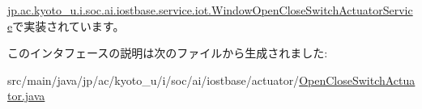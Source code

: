 \hyperlink{classjp_1_1ac_1_1kyoto__u_1_1i_1_1soc_1_1ai_1_1iostbase_1_1service_1_1iot_1_1_window_open_close_switch_actuator_service_af964501857a175cd4abf3e85bc904eff}{jp.\-ac.\-kyoto\-\_\-u.\-i.\-soc.\-ai.\-iostbase.\-service.\-iot.\-Window\-Open\-Close\-Switch\-Actuator\-Service}で実装されています。



このインタフェースの説明は次のファイルから生成されました\-:\begin{DoxyCompactItemize}
\item 
src/main/java/jp/ac/kyoto\-\_\-u/i/soc/ai/iostbase/actuator/\hyperlink{_open_close_switch_actuator_8java}{Open\-Close\-Switch\-Actuator.\-java}\end{DoxyCompactItemize}
